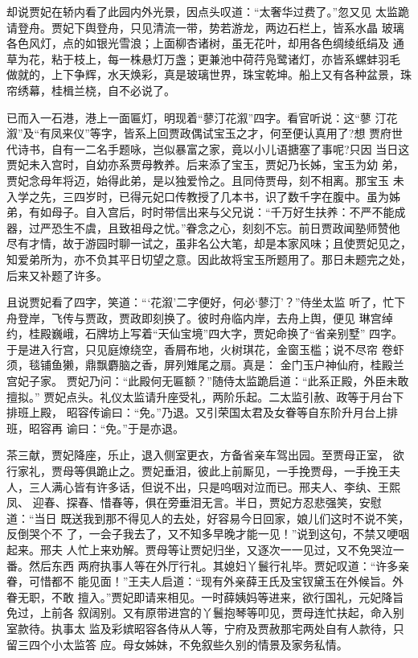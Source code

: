 却说贾妃在轿内看了此园内外光景，因点头叹道：“太奢华过费了。”忽又见
太监跪请登舟。贾妃下舆登舟，只见清流一带，势若游龙，两边石栏上，皆系水晶
玻璃各色风灯，点的如银光雪浪；上面柳杏诸树，虽无花叶，却用各色绸绫纸绢及
通草为花，粘于枝上，每一株悬灯万盏；更兼池中荷荇凫鹭诸灯，亦皆系螺蚌羽毛
做就的，上下争辉，水天焕彩，真是玻璃世界，珠宝乾坤。船上又有各种盆景，珠
帘绣幕，桂楫兰桡，自不必说了。

已而入一石港，港上一面匾灯，明现着“蓼汀花溆”四字。看官听说：这“蓼
汀花溆”及“有凤来仪”等字，皆系上回贾政偶试宝玉之才，何至便认真用了?想
贾府世代诗书，自有一二名手题咏，岂似暴富之家，竟以小儿语搪塞了事呢?只因
当日这贾妃未入宫时，自幼亦系贾母教养。后来添了宝玉，贾妃乃长姊，宝玉为幼
弟，贾妃念母年将迈，始得此弟，是以独爱怜之。且同侍贾母，刻不相离。那宝玉
未入学之先，三四岁时，已得元妃口传教授了几本书，识了数千字在腹中。虽为姊
弟，有如母子。自入宫后，时时带信出来与父兄说：“千万好生扶养：不严不能成
器，过严恐生不虞，且致祖母之忧。”眷念之心，刻刻不忘。前日贾政闻塾师赞他
尽有才情，故于游园时聊一试之，虽非名公大笔，却是本家风味；且使贾妃见之，
知爱弟所为，亦不负其平日切望之意。因此故将宝玉所题用了。那日未题完之处，
后来又补题了许多。

且说贾妃看了四字，笑道：“‘花溆’二字便好，何必‘蓼汀’？”侍坐太监
听了，忙下舟登岸，飞传与贾政，贾政即刻换了。彼时舟临内岸，去舟上舆，便见
琳宫绰约，桂殿巍峨，石牌坊上写着“天仙宝境”四大字，贾妃命换了“省亲别墅”
四字。于是进入行宫，只见庭燎绕空，香屑布地，火树琪花，金窗玉槛；说不尽帘
卷虾须，毯铺鱼獭，鼎飘麝脑之香，屏列雉尾之扇。真是：
金门玉户神仙府，桂殿兰宫妃子家。
贾妃乃问：“此殿何无匾额？”随侍太监跪启道：“此系正殿，外臣未敢擅拟。”
贾妃点头。礼仪太监请升座受礼，两阶乐起。二太监引赦、政等于月台下排班上殿，
昭容传谕曰：“免。”乃退。又引荣国太君及女眷等自东阶升月台上排班，昭容再
谕曰：“免。”于是亦退。

茶三献，贾妃降座，乐止，退入侧室更衣，方备省亲车驾出园。至贾母正室，
欲行家礼，贾母等俱跪止之。贾妃垂泪，彼此上前厮见，一手挽贾母，一手挽王夫
人，三人满心皆有许多话，但说不出，只是呜咽对泣而已。邢夫人、李纨、王熙凤、
迎春、探春、惜春等，俱在旁垂泪无言。半日，贾妃方忍悲强笑，安慰道：“当日
既送我到那不得见人的去处，好容易今日回家，娘儿们这时不说不笑，反倒哭个不
了，一会子我去了，又不知多早晚才能一见！”说到这句，不禁又哽咽起来。邢夫
人忙上来劝解。贾母等让贾妃归坐，又逐次一一见过，又不免哭泣一番。然后东西
两府执事人等在外厅行礼。其媳妇丫鬟行礼毕。贾妃叹道：“许多亲眷，可惜都不
能见面！”王夫人启道：“现有外亲薛王氏及宝钗黛玉在外候旨。外眷无职，不敢
擅入。”贾妃即请来相见。一时薛姨妈等进来，欲行国礼，元妃降旨免过，上前各
叙阔别。又有原带进宫的丫鬟抱琴等叩见，贾母连忙扶起，命入别室款待。执事太
监及彩嫔昭容各侍从人等，宁府及贾赦那宅两处自有人款待，只留三四个小太监答
应。母女姊妹，不免叙些久别的情景及家务私情。

